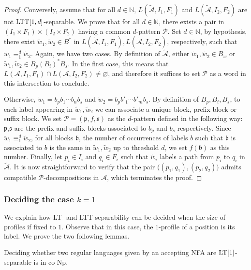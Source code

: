 \documentclass{LMCS}
\newcommand\nat{\ensuremath{\mathbb{N}}\xspace}
\newcommand\As{\ensuremath{\mathcal{A}}\xspace}
\newcommand\Ps{\ensuremath{\mathcal{P}}\xspace}
\newcommand{\lt}{\textup{LT}\xspace}
\newcommand{\ltt}{\textup{LTT}\xspace}
\newcommand\profile[1]{$#1$-profile\xspace}
\newcommand\ltteq[2]{\ensuremath{\equiv_{#1}^{#2}}\xspace}
\newcommand\decops[1]{\ensuremath{#1}-decompositions\xspace}
\newcommand\pfsdecomps{\decops{\Ps}}
\newcommand\frb{\ensuremath{\mathfrak{b}}\xspace}
\newcommand\frp{\ensuremath{\mathfrak{p}}\xspace}
\newcommand\frs{\ensuremath{\mathfrak{s}}\xspace}
\theoremstyle{plain}
\begin{document}
\begin{proof}
  \medskip
  Conversely, assume that for all $d \in \nat$,
  $L(\widetilde{\As},I_1,F_1)$ and $L(\widetilde{\As},I_2,F_2)$ are not $\ltt[1,d]$-separable. We prove that for all $d \in \nat$, there exists a pair in $(I_1\times
  F_1)\times(I_2\times F_2)$ having a common
  $d$-pattern \Ps. Set $d \in \nat$, by hypothesis, there exist
  $\widetilde{w}_1, \widetilde{w}_2 \in B^*$ in $L(\widetilde{\As},I_1,F_1),
  L(\widetilde{\As},I_2,F_2)$, respectively, such that $\widetilde{w}_1 \ltteq{1}{d}
  \widetilde{w}_2$. Again, we have two cases. By definition of
  $\widetilde{\As}$, either $\widetilde{w}_1,\widetilde{w}_2 \in B_w$
  or $\widetilde{w}_1,\widetilde{w}_2 \in B_p(B_i)^*B_s$. In the first case, this
  means that $L(\As,I_1,F_1)\cap L(\As,I_2,F_2)\neq\varnothing$, and therefore
  it suffices to set \Ps as a word in this intersection to conclude.

  Otherwise, $\widetilde{w}_1=b_pb_1\cdots b_nb_s$ and
  $\widetilde{w}_2=b_pb'_1\cdots b'_mb_s$. By definition of $B_p,B_i, B_s$,
  to each label appearing in $\widetilde{w}_1,\widetilde{w}_2$ we can associate
  a unique block, prefix block or suffix block. We set
  $\Ps=(\frp,f,\frs)$ as the $d$-pattern defined in the following
  way: \frp,\frs are the prefix and suffix blocks associated to $b_p$
  and $b_s$ respectively. Since $\widetilde{w}_1 \ltteq{1}{d} \widetilde{w}_2$,
  for all blocks $\frb$, the number of occurrences of labels $b$ such
  that \frb is associated to $b$ is the same in $\widetilde{w}_1,
  \widetilde{w}_2$ up to threshold $d$, we set $f(\frb)$ as this
  number. Finally, let $p_i\in I_i$ and $q_i\in F_i$ such that $\widetilde{w}_i$
  labels a path from $p_i$ to $q_i$ in $\widetilde{\As}$. It
  is now straightforward to verify that the pair $\bigl((p_1,q_1),(p_2,q_2)\bigr)$ admits compatible
  \pfsdecomps in $\As$, which terminates the proof.
\end{proof}

\subsubsection{Deciding the case $k=1$}

We explain how \lt- and \ltt-separability can be decided when the size
of profiles if fixed to $1$. Observe that in this case, the
\profile{1} of a position is its label. We prove the two following
lemmas.

\begin{lem} \label{lem:lt1} Deciding whether two regular languages given by
  an accepting NFA are $\lt[1]$-separable is in {\sc co-Np}.
\end{lem}
\end{document}
